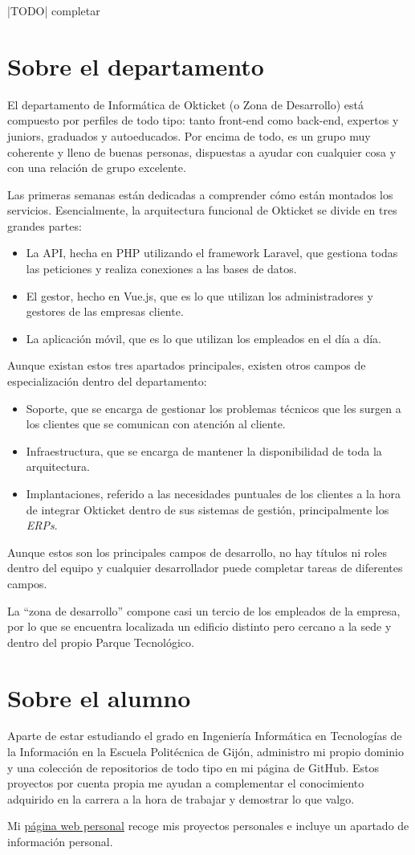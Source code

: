 |TODO| completar

\section{Sobre el departamento}
El departamento de Informática de Okticket (o Zona de Desarrollo) está compuesto por perfiles
de todo tipo: tanto front-end como back-end, expertos y juniors, graduados y autoeducados.
Por encima de todo, es un grupo muy coherente y lleno de buenas personas, dispuestas a ayudar
con cualquier cosa y con una relación de grupo excelente.

Las primeras semanas están dedicadas a comprender cómo están montados los servicios.
Esencialmente, la arquitectura funcional de Okticket se divide en tres grandes partes:
\begin{itemize}
	\item La API, hecha en PHP utilizando el framework Laravel, que gestiona todas las
		peticiones y realiza conexiones a las bases de datos.
	\item El gestor, hecho en Vue.js, que es lo que utilizan los administradores y gestores
		de las empresas cliente.
	\item La aplicación móvil, que es lo que utilizan los empleados en el día a día.
\end{itemize}

Aunque existan estos tres apartados principales, existen otros campos de especialización
dentro del departamento:
\begin{itemize}
	\item Soporte, que se encarga de gestionar los problemas técnicos que les surgen a los
		clientes que se comunican con atención al cliente.
	\item Infraestructura, que se encarga de mantener la disponibilidad de toda la arquitectura.
	\item Implantaciones, referido a las necesidades puntuales de los clientes a la
		hora de integrar Okticket dentro de sus sistemas de gestión, principalmente los \textit{ERPs}.
\end{itemize}

Aunque estos son los principales campos de desarrollo, no hay títulos ni roles dentro del
equipo y cualquier desarrollador puede completar tareas de diferentes campos.

La “zona de desarrollo” compone casi un tercio de los empleados de la empresa, por lo que se
encuentra localizada un edificio distinto pero cercano a la sede y dentro del propio Parque
Tecnológico.

\section{Sobre el alumno}
Aparte de estar estudiando el grado en Ingeniería Informática en Tecnologías de la Información
en la Escuela Politécnica de Gijón, administro mi propio dominio y una colección de
repositorios de todo tipo en mi página de GitHub. Estos proyectos por cuenta propia me ayudan
a complementar el conocimiento adquirido en la carrera a la hora de trabajar y demostrar lo que
valgo.

Mi \href{\target}{página web personal} recoge mis proyectos personales e incluye un apartado de información
personal.
